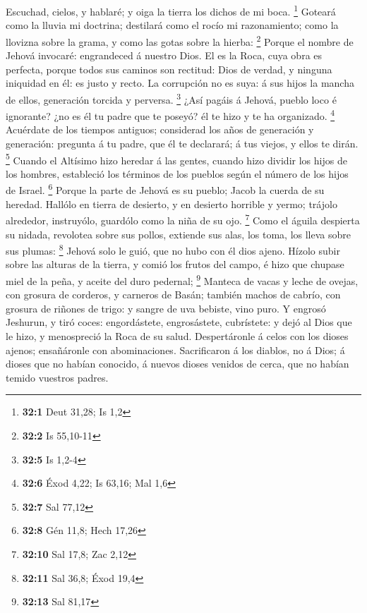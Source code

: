  Escuchad, cielos, y hablaré; y oiga la tierra los dichos de
mi boca. \footnote{\textbf{32:1} Deut 31,28; Is 1,2} 
Goteará como la lluvia mi doctrina; destilará como el rocío mi
razonamiento; como la llovizna sobre la grama, y como las gotas sobre la
hierba: \footnote{\textbf{32:2} Is 55,10-11}  Porque el
nombre de Jehová invocaré: engrandeced á nuestro Dios.  El
es la Roca, cuya obra es perfecta, porque todos sus caminos son
rectitud: Dios de verdad, y ninguna iniquidad en él: es justo y recto.
 La corrupción no es suya: á sus hijos la mancha de ellos,
generación torcida y perversa. \footnote{\textbf{32:5} Is 1,2-4}
 ¿Así pagáis á Jehová, pueblo loco é ignorante? ¿no es él tu
padre que te poseyó? él te hizo y te ha organizado. \footnote{\textbf{32:6}
  Éxod 4,22; Is 63,16; Mal 1,6}  Acuérdate de los tiempos
antiguos; considerad los años de generación y generación: pregunta á tu
padre, que él te declarará; á tus viejos, y ellos te dirán. \footnote{\textbf{32:7}
  Sal 77,12}  Cuando el Altísimo hizo heredar á las gentes,
cuando hizo dividir los hijos de los hombres, estableció los términos de
los pueblos según el número de los hijos de Israel. \footnote{\textbf{32:8}
  Gén 11,8; Hech 17,26}  Porque la parte de Jehová es su
pueblo; Jacob la cuerda de su heredad.  Hallólo en tierra
de desierto, y en desierto horrible y yermo; trájolo alrededor,
instruyólo, guardólo como la niña de su ojo. \footnote{\textbf{32:10}
  Sal 17,8; Zac 2,12}  Como el águila despierta su nidada,
revolotea sobre sus pollos, extiende sus alas, los toma, los lleva sobre
sus plumas: \footnote{\textbf{32:11} Sal 36,8; Éxod 19,4} 
Jehová solo le guió, que no hubo con él dios ajeno.  Hízolo
subir sobre las alturas de la tierra, y comió los frutos del campo, é
hizo que chupase miel de la peña, y aceite del duro pedernal;
\footnote{\textbf{32:13} Sal 81,17}  Manteca de vacas y
leche de ovejas, con grosura de corderos, y carneros de Basán; también
machos de cabrío, con grosura de riñones de trigo: y sangre de uva
bebiste, vino puro.  Y engrosó Jeshurun, y tiró coces:
engordástete, engrosástete, cubrístete: y dejó al Dios que le hizo, y
menospreció la Roca de su salud.  Despertáronle á celos con
los dioses ajenos; ensañáronle con abominaciones. 
Sacrificaron á los diablos, no á Dios; á dioses que no habían conocido,
á nuevos dioses venidos de cerca, que no habían temido vuestros padres.
